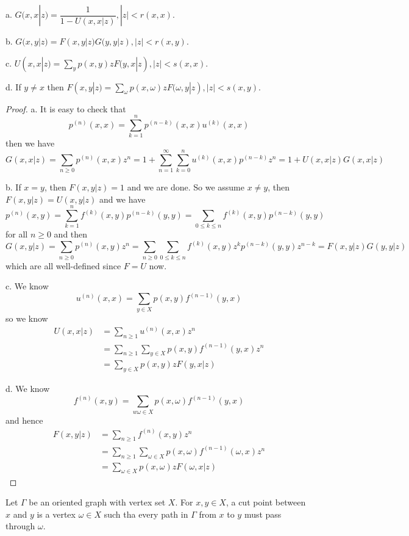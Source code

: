 \documentclass[lang=en, color=blue, ]{elegantbook}
\begin{document}
\begin{theorem}
    a. $G(x,x|z) = \dfrac{1}{1 - U(x,x|z)}, |z| < r(x,x)$.\par
    b. $G(x,y|z) = F(x,y|z)G(y,y|z), |z| < r(x,y)$.\par
    c. $U(x,x|z) = \sum_y p(x,y)zF(y,x|z), |z| < s(x,x)$.\par
    d. If $y \neq x$ then $F(x,y|z) = \sum_{\omega}p(x,\omega)zF(\omega,y|z), |z| < s(x,y)$.
\end{theorem}
\begin{proof}
    a. It is easy to check that
    \[
    p^{(n)}(x,x) = \sum\limits_{k=1}^{n}p^{(n-k)}(x,x)u^{(k)}(x,x)
    \]
    then we have
    \[
    G(x,x|z) = \sum_{n\geq 0}p^{(n)}(x,x)z^n = 1 + \sum\limits_{n=1}^{\infty}\sum\limits_{k=0}^n u^{(k)}(x,x)p^{(n-k)}z^n = 1+U(x,x|z)G(x,x|z)
    \]\par
    b. If $x= y$, then $F(x,y|z) = 1$ and we are done. So we assume $x\neq y$, then $F(x,y|z) = U(x,y|z)$ and we have
    \[
    p^{(n)}(x,y) = \sum\limits_{k=1}^n f^{(k)}(x,y)p^{(n-k)}(y,y) = \sum\limits_{0\leq k \leq n}f^{(k)}(x,y)p^{(n-k)}(y,y)
    \]
    for all $n\geq 0$ and then
    \[
    G(x,y|z) = \sum\limits_{n\geq 0}p^{(n)}(x,y)z^n = \sum\limits_{n\geq 0} \sum\limits_{0\leq k \leq n}f^{(k)}(x,y)z^k p^{(n-k)}(y,y)z^{n-k} = F(x,y|z)G(y,y|z)
    \]
    which are all well-defined since $F = U$ now.\par
    c. We know
    \[
    u^{(n)}(x,x) = \sum\limits_{y\in X} p(x,y)f^{(n-1)}(y,x)
    \]
    so we know
    \[
    \begin{aligned}
    U(x,x|z) &= \sum\limits_{n\geq 1} u^{(n)}(x,x)z^n \\ &= \sum\limits_{n\geq 1}\sum\limits_{y\in X}p(x,y)f^{(n-1)}(y,x)z^n \\ &= \sum\limits_{y\in X}p(x,y)zF(y,x|z)
    \end{aligned}
    \]\par
    d. We know
    \[
    f^{(n)}(x,y) = \sum\limits_{w\omega\in X} p(x,\omega)f^{(n-1)}(y,x)
    \]
    and hence
    \[
    \begin{aligned}
    F(x,y|z) &= \sum\limits_{n\geq 1} f^{(n)}(x,y)z^n \\ &= \sum\limits_{n\geq 1}\sum\limits_{\omega\in X}p(x,\omega)f^{(n-1)}(\omega,x)z^n \\ &= \sum\limits_{\omega\in X}p(x,\omega)zF(\omega,x|z)
    \end{aligned}
    \]
\end{proof}

\begin{definition}
    Let $\Gamma$ be an oriented graph with vertex set $X$. For $x,y\in X$, a cut point between $x$ and $y$ is a vertex $\omega \in X$ such tha every path in $\Gamma$ from $x$ to $y$ must pass through $\omega$.
\end{definition}
\end{document}
